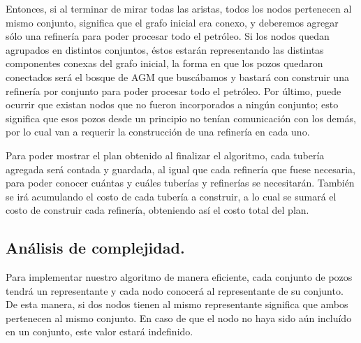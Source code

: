 Entonces, si al terminar de mirar todas las aristas, todos los nodos pertenecen al mismo conjunto, significa que el grafo inicial era conexo, y deberemos agregar sólo una refinería para poder procesar todo el petróleo.  Si los nodos quedan agrupados en distintos conjuntos, éstos estarán representando las distintas componentes conexas del grafo inicial, la forma en que los pozos quedaron conectados será el bosque de AGM que buscábamos y bastará con construir una refinería por conjunto para poder procesar todo el petróleo.  Por último, puede ocurrir que existan nodos que no fueron incorporados a ningún conjunto; esto significa que esos pozos desde un principio no tenían comunicación con los demás, por lo cual van a requerir la construcción de una refinería en cada uno.

Para poder mostrar el plan obtenido al finalizar el algoritmo, cada tubería agregada será contada y guardada, al igual que cada refinería que fuese necesaria, para poder conocer cuántas y cuáles tuberías y refinerías se necesitarán.  También se irá acumulando el costo de cada tubería a construir, a lo cual se sumará el costo de construir cada refinería, obteniendo así el costo total del plan.

\vspace*{0.6cm}

\subsection{Análisis de complejidad.}

\vspace*{0.3cm}

Para implementar nuestro algoritmo de manera eficiente, cada conjunto de pozos tendrá un representante y cada nodo conocerá al representante de su conjunto. De esta manera, si dos nodos tienen al mismo representante significa que ambos pertenecen al mismo conjunto.  En caso de que el nodo no haya sido aún incluído en un conjunto, este valor estará indefinido.

